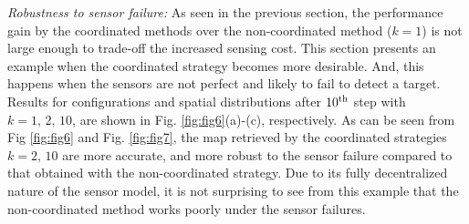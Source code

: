 \documentclass[journal]{IEEEtran}
\begin{document}
\textit{Robustness to sensor failure:}
As seen in the previous section, the performance gain by the coordinated methods over the non-coordinated method ($k=1$) is not large enough to trade-off the increased sensing cost.
This section presents an example when the coordinated strategy becomes more desirable. And, this happens when the sensors are not perfect and likely to fail to detect a target. 
Results for configurations and spatial distributions after $10^{\textup{th}}$ step with $k=1,\,2,\,10$, are shown in Fig. \ref{fig:fig6}(a)-(c), respectively.  
As can be seen from Fig \ref{fig:fig6} and Fig. \ref{fig:fig7}, the map retrieved by the coordinated strategies $k=2,\,10$ are more accurate, and more robust to the sensor failure compared to that obtained with the non-coordinated strategy. 
Due to its fully decentralized nature of the sensor model, it is not surprising to see from this example that the non-coordinated method works poorly under the sensor failures. 
\end{document}
